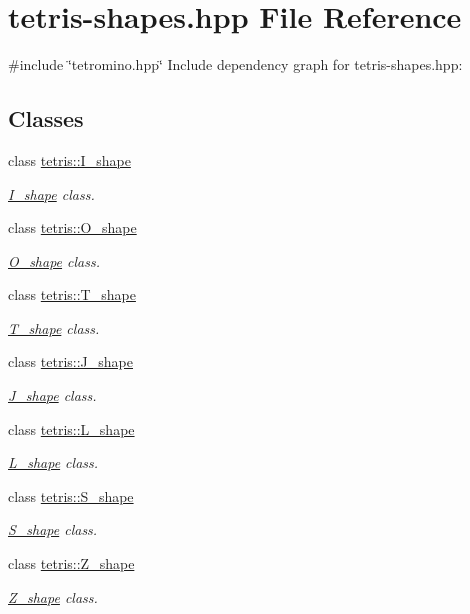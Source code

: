 \hypertarget{tetris-shapes_8hpp}{}\section{tetris-\/shapes.hpp File Reference}
\label{tetris-shapes_8hpp}
{\ttfamily \#include \char`\"{}tetromino.\+hpp\char`\"{}}\newline
Include dependency graph for tetris-\/shapes.hpp\+:
\subsection*{Classes}
\begin{DoxyCompactItemize}
\item 
class \hyperlink{classtetris_1_1I__shape}{tetris\+::\+I\+\_\+shape}
\begin{DoxyCompactList}\small\item\em \hyperlink{classtetris_1_1I__shape}{I\+\_\+shape} class. \end{DoxyCompactList}\item 
class \hyperlink{classtetris_1_1O__shape}{tetris\+::\+O\+\_\+shape}
\begin{DoxyCompactList}\small\item\em \hyperlink{classtetris_1_1O__shape}{O\+\_\+shape} class. \end{DoxyCompactList}\item 
class \hyperlink{classtetris_1_1T__shape}{tetris\+::\+T\+\_\+shape}
\begin{DoxyCompactList}\small\item\em \hyperlink{classtetris_1_1T__shape}{T\+\_\+shape} class. \end{DoxyCompactList}\item 
class \hyperlink{classtetris_1_1J__shape}{tetris\+::\+J\+\_\+shape}
\begin{DoxyCompactList}\small\item\em \hyperlink{classtetris_1_1J__shape}{J\+\_\+shape} class. \end{DoxyCompactList}\item 
class \hyperlink{classtetris_1_1L__shape}{tetris\+::\+L\+\_\+shape}
\begin{DoxyCompactList}\small\item\em \hyperlink{classtetris_1_1L__shape}{L\+\_\+shape} class. \end{DoxyCompactList}\item 
class \hyperlink{classtetris_1_1S__shape}{tetris\+::\+S\+\_\+shape}
\begin{DoxyCompactList}\small\item\em \hyperlink{classtetris_1_1S__shape}{S\+\_\+shape} class. \end{DoxyCompactList}\item 
class \hyperlink{classtetris_1_1Z__shape}{tetris\+::\+Z\+\_\+shape}
\begin{DoxyCompactList}\small\item\em \hyperlink{classtetris_1_1Z__shape}{Z\+\_\+shape} class. \end{DoxyCompactList}\end{DoxyCompactItemize}
